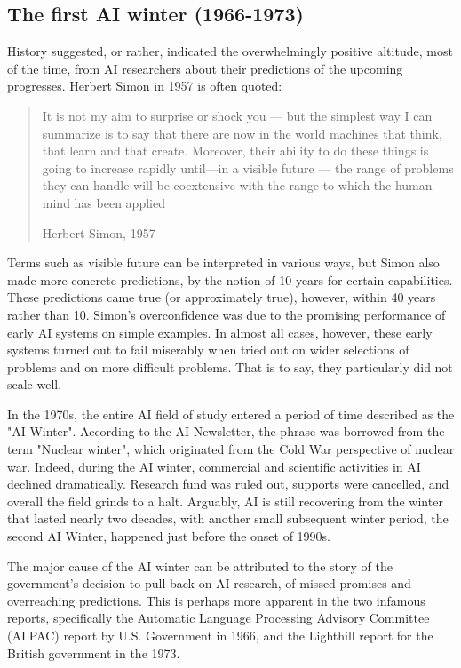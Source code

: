 \subsection{The first AI winter (1966-1973)}

History suggested, or rather, indicated the overwhelmingly positive altitude, most of the time, from AI researchers about their predictions of the upcoming progresses. Herbert Simon in 1957 is often quoted: 
\blockquote[Herbert Simon, 1957]{It is not my aim to surprise or shock you --- but the simplest way I can summarize is to say that there are now in the world machines that think, that learn and that create. Moreover, their ability to do these things is going to increase rapidly until—in a visible future --- the range of problems they can handle will be coextensive with the range to which the human mind has been applied}

Terms such as visible future can be interpreted in various ways, but Simon also made more concrete predictions, by the notion of 10 years for certain capabilities. These predictions came true (or approximately true), however, within 40 years rather than 10. Simon's overconfidence was due to the promising performance of early AI systems on simple examples. In almost all cases, however, these early systems turned out to fail miserably when tried out on wider selections of problems and on more difficult problems. That is to say, they particularly did not scale well. 

In the 1970s, the entire AI field of study entered a period of time described as the "AI Winter". According to the AI Newsletter, the phrase was borrowed from the term "Nuclear winter", which originated from the Cold War perspective of nuclear war. Indeed, during the AI winter, commercial and scientific activities in AI declined dramatically. Research fund was ruled out, supports were cancelled, and overall the field grinds to a halt. Arguably, AI is still recovering from the winter that lasted nearly two decades, with another small subsequent winter period, the second AI Winter, happened just before the onset of 1990s. 

The major cause of the AI winter can be attributed to the story of the government's decision to pull back on AI research, of missed promises and overreaching predictions. This is perhaps more apparent in the two infamous reports, specifically the Automatic Language Processing Advisory Committee (ALPAC) report by U.S. Government in 1966, and the Lighthill report for the British government in the 1973. 

